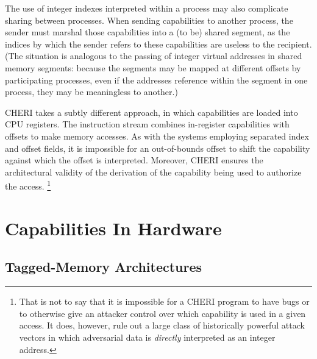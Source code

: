 The use of integer indexes interpreted within a process may also complicate
sharing between processes.  When sending capabilities to another process, the
sender must marshal those capabilities into a (to be) shared segment, as the
indices by which the sender refers to these capabilities are useless to the
recipient.  (The situation is analogous to the passing of integer virtual
addresses in shared memory segments: because the segments may be mapped at
different offsets by participating processes, even if the addresses reference
within the segment in one process, they may be meaningless to another.)

CHERI takes a subtly different approach, in which capabilities are loaded into
CPU registers.  The instruction stream combines in-register capabilities with
offsets to make memory accesses.  As with the systems employing separated index
and offset fields, it is impossible for an out-of-bounds offset to shift the
capability against which the offset is interpreted.  Moreover, CHERI ensures
the architectural validity of the derivation of the capability being used to
authorize the access.%
%
\footnote{That is not to say that it is impossible for a CHERI program to have
bugs or to otherwise give an attacker control over which capability is used in
a given access.  It does, however, rule out a large class of historically
powerful attack vectors in which adversarial data is \emph{directly}
interpreted as an integer address.}

\section{Capabilities In Hardware} %

\subsection{Tagged-Memory Architectures} %

